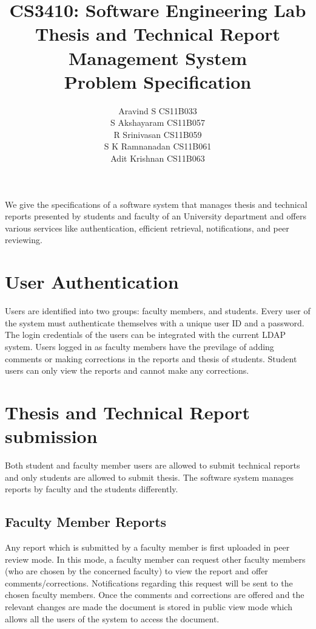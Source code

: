 \documentclass{article}
\begin{document}
\title{\textbf{CS3410: Software Engineering Lab}
\\
\textbf{Thesis and Technical Report Management System\\Problem Specification}}
\author{ Aravind S CS11B033 \\
		 S Akshayaram CS11B057\\
		 R Srinivasan CS11B059\\
		 S K Ramnanadan CS11B061\\
		 Adit Krishnan  CS11B063\\
[0.2in]
}

\maketitle

We give the specifications of a software system that manages thesis and technical reports presented by students and faculty of an University department and offers various services like authentication, efficient retrieval, notifications, and peer reviewing. 

\section{User Authentication}

Users are identified into two groups: faculty members, and students. Every user of the system must authenticate themselves with a unique user ID and a password. The login credentials of the users can be integrated with the current LDAP system. Users logged in as faculty members have the previlage of adding comments or making corrections in the reports and thesis of students. Student users can only view the reports and cannot make any corrections.

\section{Thesis and Technical Report submission}

Both student and faculty member users are allowed to submit technical reports and only students are allowed to submit thesis. The software system manages reports by faculty and the students differently.
\subsection{Faculty Member Reports}

Any report which is submitted by a faculty member is first uploaded in peer review mode. In this mode, a faculty member can request other faculty members (who are chosen by the concerned faculty) to view the report and offer comments/corrections. Notifications regarding this request will be sent to the chosen faculty members. Once the comments and corrections are offered and the relevant changes are made the document is stored in public view mode which allows all the users of the system to access the document.
\end{document}
